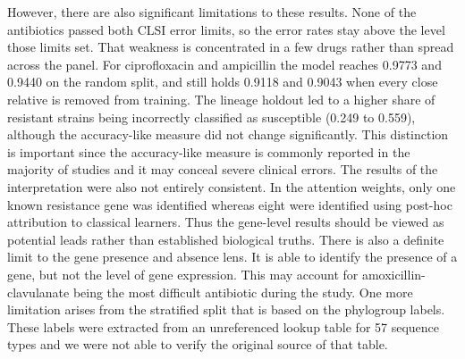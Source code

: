 However, there are also significant limitations to these results. None of the
antibiotics passed both CLSI error limits, so the error rates stay above the level
those limits set. That weakness is concentrated in a few drugs rather than spread
across the panel. For ciprofloxacin and ampicillin the model reaches 0.9773 and
0.9440 on the random split, and still holds 0.9118 and 0.9043 when every close
relative is removed from training. The lineage holdout led to a higher share of resistant strains being incorrectly
classified as susceptible (0.249 to 0.559), although the accuracy-like measure did
not change significantly. This distinction is important since the accuracy-like
measure is commonly reported in the majority of studies and it may conceal severe
clinical errors. The results of the interpretation were also not entirely consistent.
In the attention weights, only one known resistance gene was identified whereas eight
were identified using post-hoc attribution to classical learners. Thus the gene-level
results should be viewed as potential leads rather than established biological
truths. There is also a definite limit to the gene presence and absence lens. It is
able to identify the presence of a gene, but not the level of gene expression. This
may account for amoxicillin-clavulanate being the most difficult antibiotic during
the study. One more limitation arises from the stratified split that is based on the
phylogroup labels. These labels were extracted from an unreferenced lookup table for
57 sequence types and we were not able to verify the original source of that table.

